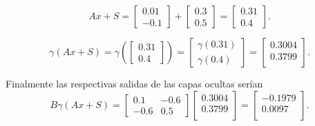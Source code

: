 \begin{equation}
    A x +S= 
    \begin{bmatrix}
        0.01  \\
        -0.1 
    \end{bmatrix}
    + 
    \begin{bmatrix}
        0.3  \\
        0.5 
    \end{bmatrix}
    = 
    \begin{bmatrix}
        0.31  \\
        0.4 
    \end{bmatrix}
    . 
\end{equation}

\begin{equation}
    \gamma (A x +S) = 
    \gamma \left(
    \begin{bmatrix}
        0.31  \\
        0.4 
    \end{bmatrix}
    \right)
    = 
    \begin{bmatrix}
        \gamma(0.31)  \\
        \gamma(0.4) 
    \end{bmatrix}
    = 
    \begin{bmatrix}
        0.3004 \\
        0.3799  \\
    \end{bmatrix}.
\end{equation}

Finalmente las respectivas salidas de las capas ocultas serían
\begin{equation}
    B  \gamma (A x +S)  
    = 
    \begin{bmatrix}
        0.1 & -0.6 \\
        -0.6 & 0.5
    \end{bmatrix}
    \begin{bmatrix}
        0.3004 \\
        0.3799  \\
    \end{bmatrix}
    = 
    \begin{bmatrix}
        -0.1979 \\
       0.0097  \\
    \end{bmatrix}.
\end{equation}